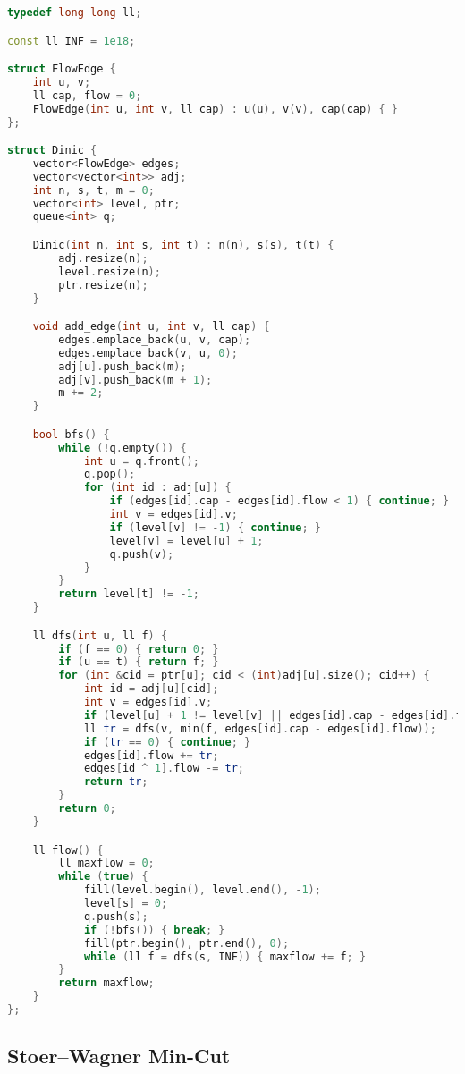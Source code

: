\documentclass[11pt, a4paper, twoside]{article}
\begin{document}
\begin{lstlisting}[language=C++]
typedef long long ll;

const ll INF = 1e18;

struct FlowEdge {
    int u, v;
    ll cap, flow = 0;
    FlowEdge(int u, int v, ll cap) : u(u), v(v), cap(cap) { }
};

struct Dinic {
    vector<FlowEdge> edges;
    vector<vector<int>> adj;
    int n, s, t, m = 0;
    vector<int> level, ptr;
    queue<int> q;

    Dinic(int n, int s, int t) : n(n), s(s), t(t) {
        adj.resize(n);
        level.resize(n);
        ptr.resize(n);
    }

    void add_edge(int u, int v, ll cap) {
        edges.emplace_back(u, v, cap);
        edges.emplace_back(v, u, 0);
        adj[u].push_back(m);
        adj[v].push_back(m + 1);
        m += 2;
    }

    bool bfs() {
        while (!q.empty()) {
            int u = q.front();
            q.pop();
            for (int id : adj[u]) {
                if (edges[id].cap - edges[id].flow < 1) { continue; }
                int v = edges[id].v;
                if (level[v] != -1) { continue; }
                level[v] = level[u] + 1;
                q.push(v);
            }
        }
        return level[t] != -1;
    }

    ll dfs(int u, ll f) {
        if (f == 0) { return 0; }
        if (u == t) { return f; }
        for (int &cid = ptr[u]; cid < (int)adj[u].size(); cid++) {
            int id = adj[u][cid];
            int v = edges[id].v;
            if (level[u] + 1 != level[v] || edges[id].cap - edges[id].flow < 1) { continue; }
            ll tr = dfs(v, min(f, edges[id].cap - edges[id].flow));
            if (tr == 0) { continue; }
            edges[id].flow += tr;
            edges[id ^ 1].flow -= tr;
            return tr;
        }
        return 0;
    }

    ll flow() {
        ll maxflow = 0;
        while (true) {
            fill(level.begin(), level.end(), -1);
            level[s] = 0;
            q.push(s);
            if (!bfs()) { break; }
            fill(ptr.begin(), ptr.end(), 0);
            while (ll f = dfs(s, INF)) { maxflow += f; }
        }
        return maxflow;
    }
};
\end{lstlisting}

\subsection{Stoer–Wagner Min-Cut}
\end{document}
